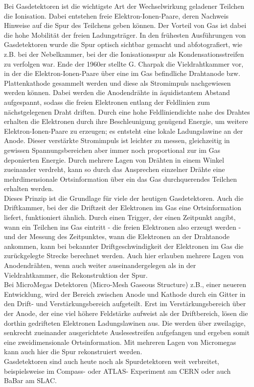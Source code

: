 \documentclass{PoS}
\begin{document}
Bei Gasdetektoren ist die wichtigste Art der Wechselwirkung geladener Teilchen die Ionisation. Dabei
entstehen freie Elektron-Ionen-Paare, deren Nachweis Hinweise auf die Spur des Teilchens geben
können. Der Vorteil von Gas ist dabei die hohe Mobilität der freien Ladungsträger.
In den frühesten Ausführungen von Gasdetektoren wurde die Spur optisch sichtbar gemacht und
abfotografiert, wie z.B. bei der Nebelkammer, bei der die Ionisationsspur als Kondensationsstreifen
zu verfolgen war. Ende der 1960er stellte G. Charpak die Vieldrahtkammer vor, in der die
Elektron-Ionen-Paare über eine im Gas befindliche Drahtanode bzw. Plattenkathode
gesammelt werden und diese als Stromimpuls nachgewiesen werden können. Dabei werden die Anodendrähte
in äquidistantem Abstand aufgespannt, sodass die freien Elektronen entlang der Feldlinien zum
nächstgelegenen Draht driften. Durch eine hohe Feldliniendichte nahe des Drahtes erhalten die
Elektronen durch ihre Beschleunigung genügend Energie, um weitere Elektron-Ionen-Paare zu erzeugen;
es entsteht eine lokale Ladungslawine an der Anode. Dieser verstärkte Stromimpuls ist leichter zu
messen, gleichzeitig in gewissen Spannungsbereichen aber immer noch proportional zur im Gas
deponierten Energie.
Durch mehrere Lagen von Drähten in einem Winkel zueinander verdreht, kann so durch das Ansprechen
einzelner Drähte eine mehrdimensionale Ortsinformation über ein das Gas durchquerendes Teilchen
erhalten werden.
\\
Dieses Prinzip ist die Grundlage für viele der heutigen Gasdetektoren. Auch die Driftkammer, bei der
die Driftzeit der Elektronen im Gas eine Ortsinformation liefert, funktioniert ähnlich. Durch einen
Trigger, der einen Zeitpunkt angibt, wann ein Teilchen ins Gas eintritt - die freien Elektronen also
erzeugt werden - und der Messung des Zeitpunktes, wann die Elektronen an der Drahtanode ankommen,
kann bei bekannter Driftgeschwindigkeit der Elektronen im Gas die zurückgelegte Strecke berechnet werden.
Auch hier erlauben mehrere Lagen von Anodendrähten, wenn auch weiter auseinandergelegen als in der
Vieldrahtkammer, die Rekonstruktion der Spur.
\\
Bei MicroMegas Detektoren (Micro-Mesh Gaseous Structure) z.B., einer neueren Entwicklung, wird der
Bereich zwischen Anode und Kathode durch ein Gitter in den Drift- und Verstärkungsbereich
aufgeteilt. Erst im Verstärkungsbereich über der Anode, der eine viel höhere Feldstärke aufweist
als der Driftbereich, lösen die dorthin gedrifteten Elektronen Ladungslawinen aus. Die werden über
zweilagige, senkrecht zueinander ausgerichtete Auslesestreifen aufgefangen und ergeben somit eine
zweidimensionale Ortsinformation. Mit mehreren Lagen von Micromegas kann auch hier die Spur
rekonstruiert werden.
\\
Gasdetektoren sind auch heute noch als Spurdetektoren weit verbreitet, beispielsweise im Compass-
oder ATLAS- Experiment am CERN oder auch BaBar am SLAC.
\end{document}
